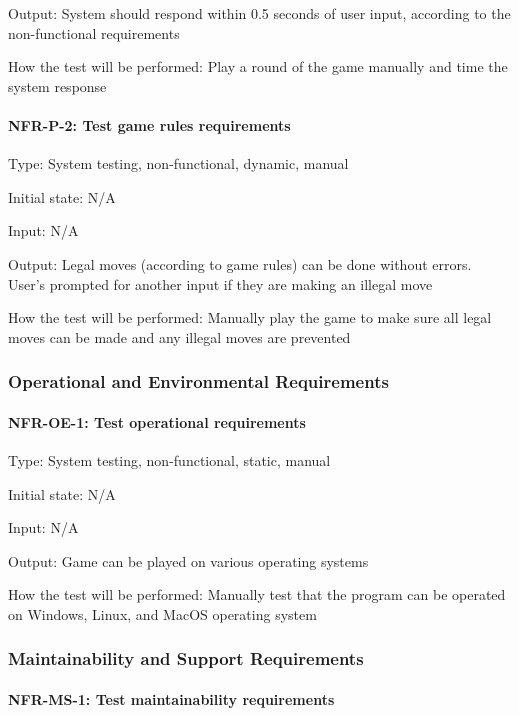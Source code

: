 \documentclass[12pt, titlepage]{article}
\begin{document}
Output: System should respond within 0.5 seconds of user input, according to the non-functional requirements

How the test will be performed: Play a round of the game manually and time the system response

\paragraph{NFR-P-2: Test game rules requirements\\}

Type: System testing, non-functional, dynamic, manual

Initial state: N/A

Input: N/A

Output: Legal moves (according to game rules) can be done without errors. User's prompted for another input if they are making an illegal move

How the test will be performed: Manually play the game to make sure all legal moves can be made and any illegal moves are prevented

\subsubsection{Operational and Environmental Requirements}

\paragraph{NFR-OE-1: Test operational requirements\\}

Type: System testing, non-functional, static, manual

Initial state: N/A

Input: N/A

Output: Game can be played on various operating systems

How the test will be performed: Manually test that the program can be operated on Windows, Linux, and MacOS operating system

\subsubsection{Maintainability and Support Requirements}

\paragraph{NFR-MS-1: Test maintainability requirements\\}
\end{document}
